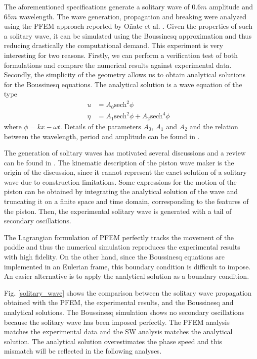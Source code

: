 The aforementioned specifications generate a solitary wave of $0.6m$ amplitude and $65m$ wavelength. The wave generation, propagation and breaking were analyzed using the PFEM approach reported by Oñate et al. \cite{onate2022}.
Given the properties of such a solitary wave, it can be simulated using the Boussinesq approximation and thus reducing drastically the computational demand.
This experiment is very interesting for two reasons. Firstly, we can perform a verification test of both formulations and compare the numerical results against experimental data.
Secondly, the simplicity of the geometry allows us to obtain analytical solutions for the Boussinesq equations.
The analytical solution is a wave equation of the type
\begin{equation*}
\begin{split}
    u &= A_0 \text{sech}^2\phi \\
    \eta &= A_1 \text{sech}^2\phi + A_2 \text{sech}^4\phi
\end{split}
\end{equation*}
where $\phi=kx-\omega t$. Details of the parameters $A_0$, $A_1$ and $A_2$ and the relation between the wavelength, period and amplitude can be found in \cite{wei1995}.


The generation of solitary waves has motivated several discussions and a review can be found in \cite{guizien2010}.
The kinematic description of the piston wave maker is the origin of the discussion, since it cannot represent the exact solution of a solitary wave due to construction limitations.
Some expressions for the motion of the piston can be obtained by integrating the analytical solution of the wave and truncating it on a finite space and time domain, corresponding to the features of the piston. Then, the experimental solitary wave is generated with a tail of secondary oscillations.

The Lagrangian formulation of PFEM perfectly tracks the movement of the paddle and thus the numerical simulation reproduces the experimental results with high fidelity. On the other hand, since the Boussinesq equations are implemented in an Eulerian frame, this boundary condition is difficult to impose. An easier alternative is to apply the analytical solution as a boundary condition.

Fig. \ref{solitary_wave} shows the comparison between the solitary wave propagation obtained with the PFEM, the experimental results, and the Boussinesq and analytical solutions. The Boussinesq simulation shows no secondary oscillations because the solitary wave has been imposed perfectly. The PFEM analysis matches the experimental data and the SW analysis matches the analytical solution. The analytical solution overestimates the phase speed and this mismatch will be reflected in the following analyses. 

